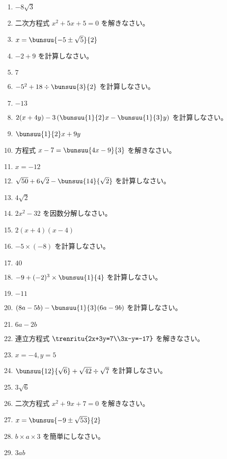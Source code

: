 \documentclass[uplatex,a4j,11pt]{jsreport}
\begin{document}
\begin{multicols}{2}
\begin{enumerate}
    \item $-8\sqrt{3}$
    \item 二次方程式 $x^2+5x+5=0$ を解きなさい。%
    \item $x = \bunsuu{-5\pm\sqrt{5}}{2}$
    \item $-2+9$ を計算しなさい。%
    \item $7$
    \item $-5^2+18\div \bunsuu{3}{2}$ を計算しなさい。%
    \item $-13$
    \item $2(x+4y)-3\left(\bunsuu{1}{2}x-\bunsuu{1}{3}y\right)$ を計算しなさい。%
    \item $\bunsuu{1}{2}x+9y$
    \item 方程式 $x-7=\bunsuu{4x-9}{3}$ を解きなさい。%
    \item $x=-12$
    \item $\sqrt{50}+6\sqrt{2}-\bunsuu{14}{\sqrt{2}}$ を計算しなさい。%
    \item $4\sqrt{2}$
    \item $2x^2-32$ を因数分解しなさい。%
    \item $2(x+4)(x-4)$
    \item $-5\times (-8)$ を計算しなさい。%
    \item $40$
    \item $-9+(-2)^3\times \bunsuu{1}{4}$ を計算しなさい。%
    \item $-11$
    \item $(8a-5b)-\bunsuu{1}{3}(6a-9b)$ を計算しなさい。%
    \item $6a-2b$
    \item 連立方程式 $\trenritu{2x+3y=7\\3x-y=-17}$ を解きなさい。%
    \item $x=-4, y=5$
    \item $\bunsuu{12}{\sqrt{6}}+\sqrt{42}\div \sqrt{7}$ を計算しなさい。%
    \item $3\sqrt{6}$
    \item 二次方程式 $x^2+9x+7=0$ を解きなさい。%
    \item $x=\bunsuu{-9\pm\sqrt{53}}{2}$
    \item $b\times a\times 3$ を簡単にしなさい。%
    \item $3ab$

\end{enumerate}
\end{multicols}
\end{document}
